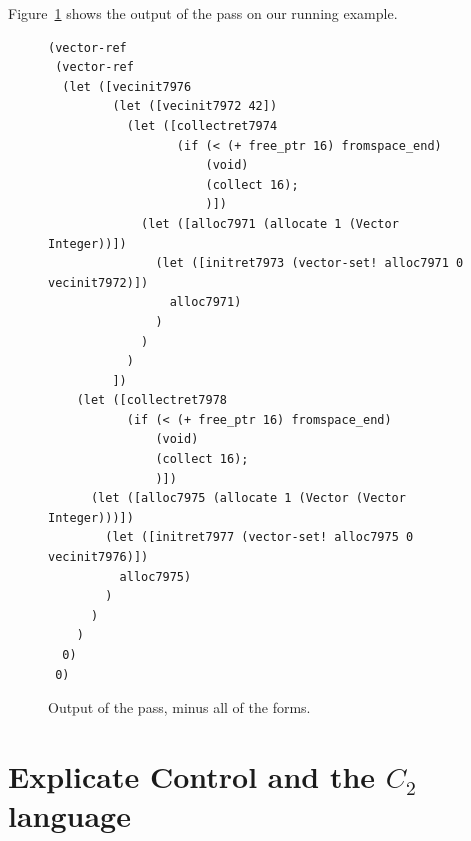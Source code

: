 \documentclass[11pt]{book}
\begin{document}
Figure~\ref{fig:expose-alloc-output} shows the output of the
 pass on our running example.

\begin{figure}[tbp]
\begin{lstlisting}
(vector-ref
 (vector-ref
  (let ([vecinit7976
         (let ([vecinit7972 42])
           (let ([collectret7974
                  (if (< (+ free_ptr 16) fromspace_end)
                      (void)
                      (collect 16);
                      )])
             (let ([alloc7971 (allocate 1 (Vector Integer))])
               (let ([initret7973 (vector-set! alloc7971 0 vecinit7972)])
                 alloc7971)
               )
             )
           )
         ])
    (let ([collectret7978
           (if (< (+ free_ptr 16) fromspace_end)
               (void)
               (collect 16);
               )])
      (let ([alloc7975 (allocate 1 (Vector (Vector Integer)))])
        (let ([initret7977 (vector-set! alloc7975 0 vecinit7976)])
          alloc7975)
        )
      )
    )
  0)
 0)
\end{lstlisting}
\caption{Output of the  pass, minus
  all of the  forms.}
\label{fig:expose-alloc-output}
\end{figure}



\section{Explicate Control and the $C_2$ language}
\label{sec:explicate-control-r3}
\end{document}
